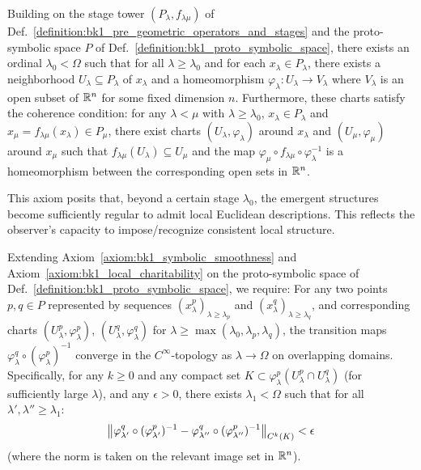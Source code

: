 \begin{axiom}
\label{axiom:bk1_local_charitability}
Building on the stage tower $(P_\lambda, f_{\lambda\mu})$ of Def.~\ref{definition:bk1_pre_geometric_operators_and_stages} and the proto-symbolic space $P$ of Def.~\ref{definition:bk1_proto_symbolic_space}, there exists an ordinal $\lambda_0 < \Omega$ such that for all $\lambda \geq \lambda_0$ and for each $x_\lambda \in P_\lambda$, there exists a neighborhood $U_\lambda \subseteq P_\lambda$ of $x_\lambda$ and a homeomorphism $\varphi_\lambda: U_\lambda \to V_\lambda$ where $V_\lambda$ is an open subset of $\mathbb{R}^n$ for some fixed dimension $n$.
Furthermore, these charts satisfy the coherence condition: for any $\lambda < \mu$ with $\lambda \ge \lambda_0$, $x_\lambda \in P_\lambda$ and $x_\mu = f_{\lambda\mu}(x_\lambda) \in P_\mu$, there exist charts $(U_\lambda, \varphi_\lambda)$ around $x_\lambda$ and $(U_\mu, \varphi_\mu)$ around $x_\mu$ such that $f_{\lambda\mu}(U_\lambda) \subseteq U_\mu$ and the map $\varphi_\mu \circ f_{\lambda\mu} \circ \varphi_\lambda^{-1}$ is a homeomorphism between the corresponding open sets in $\mathbb{R}^n$.
\end{axiom}
\begin{remark}
This axiom posits that, beyond a certain stage $\lambda_0$, the emergent structures become sufficiently regular to admit local Euclidean descriptions. This reflects the observer's capacity to impose/recognize consistent local structure.
\end{remark}
\begin{axiom}
\label{axiom:bk1_smooth_convergence}
Extending Axiom~\ref{axiom:bk1_symbolic_smoothness} and Axiom~\ref{axiom:bk1_local_charitability} on the proto-symbolic space of Def.~\ref{definition:bk1_proto_symbolic_space}, we require:
For any two points $p, q \in P$ represented by sequences $(x_\lambda^p)_{\lambda \ge \lambda_p}$ and $(x_\lambda^q)_{\lambda \ge \lambda_q}$, and corresponding charts $(U_\lambda^p, \varphi_\lambda^p)$, $(U_\lambda^q, \varphi_\lambda^q)$ for $\lambda \ge \max(\lambda_0, \lambda_p, \lambda_q)$, the transition maps $\varphi_\lambda^q \circ (\varphi_\lambda^p)^{-1}$ converge in the $C^\infty$-topology as $\lambda \to \Omega$ on overlapping domains.
Specifically, for any $k \ge 0$ and any compact set $K \subset \varphi_\lambda^p(U_\lambda^p \cap U_\lambda^q)$ (for sufficiently large $\lambda$), and any $\epsilon > 0$, there exists $\lambda_1 < \Omega$ such that for all $\lambda', \lambda'' \ge \lambda_1$:
\[
\left\| \varphi_{\lambda'}^q \circ (\varphi_{\lambda'}^p)^{-1} - \varphi_{\lambda''}^q \circ (\varphi_{\lambda''}^p)^{-1} \right\|_{C^k(K)} < \epsilon
\]
(where the norm is taken on the relevant image set in $\mathbb{R}^n$).
\end{axiom}
